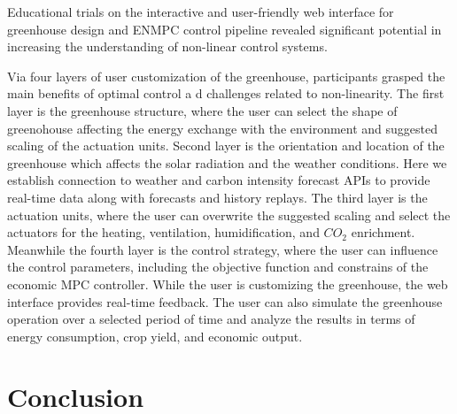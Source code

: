 \documentclass[conference]{IEEEtran}
\begin{document}
Educational trials on the interactive and user-friendly web interface for greenhouse design and ENMPC control pipeline revealed significant potential in increasing the understanding of non-linear control systems.

Via four layers of user customization of the greenhouse, participants grasped the main benefits of optimal control a d challenges related to non-linearity. The first layer is the greenhouse structure, where the user can select the shape of greenohouse affecting the energy exchange with the environment and suggested scaling of the actuation units. Second layer is the orientation and location of the greenhouse which affects the solar radiation and the weather conditions. Here we establish connection to weather and carbon intensity forecast APIs to provide real-time data along with forecasts and history replays. The third layer is the actuation units, where the user can overwrite the suggested scaling and select the actuators for the heating, ventilation, humidification, and \(CO_2\) enrichment. Meanwhile the fourth layer is the control strategy, where the user can influence the control parameters, including the objective function and constrains of the economic MPC controller. While the user is customizing the greenhouse, the web interface provides real-time feedback. The user can also simulate the greenhouse operation over a selected period of time and analyze the results in terms of energy consumption, crop yield, and economic output.

\section{Conclusion}



\end{document}
